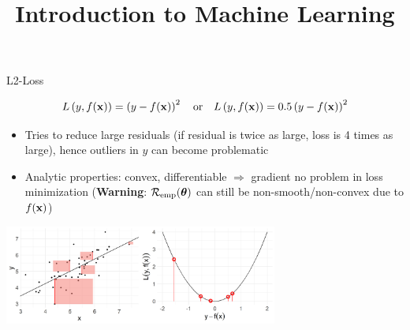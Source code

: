 \documentclass[11pt,compress,t,notes=noshow, xcolor=table]{beamer}
\title{Introduction to Machine Learning}
\institute{\href{https://compstat-lmu.github.io/lecture_i2ml/}{compstat-lmu.github.io/lecture\_i2ml}}
\date{}
\begin{document}

\begin{vbframe}{L2-Loss}

\vspace*{-0.5cm}

$$
L\left(y, f(\mathbf{x})\right) = \left(y-f(\mathbf{x})\right)^2 \quad \text{or} \quad L\left(y, f(\mathbf{x})\right) = 0.5 \left(y-f(\mathbf{x})\right)^2
$$

\vspace*{-2mm}

\begin{itemize}
\item Tries to reduce large residuals (if residual is twice as large, loss is 4 times as large), hence outliers in $y$ can become problematic
\item Analytic properties: convex, differentiable $\Rightarrow$ gradient no problem in loss minimization (\textbf{Warning}: $\mathcal{R}_{\text{emp}}(\bm{\theta})$ can still be non-smooth/non-convex due to $f(\mathbf{x})$)
\end{itemize}






\begin{center}
  \includegraphics[width = 9cm]{figure/loss_quadratic_2.png} \\
\end{center}

\end{vbframe}
\end{document}
